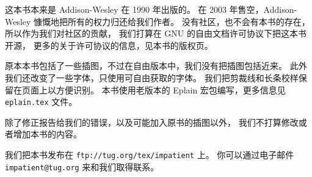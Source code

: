  这本书本来是 Addison-Wesley 在 1990 年出版的。
在 2003 年售空，Addison-Wesley 慷慨地把所有的权力归还给我们作者。
没有社区，也不会有本书的存在，所以作为我们对社区的贡献，
我们打算在 GNU 的自由文档许可协议下把这本书开源，
更多的关于许可协议的信息，见本书的版权页。


原本本书包括了一些插图，不过在自由版本中，我们没有把插图包括近来。
此外我们还改变了一些字体，只使用可自由获取的字体。
我们把剪裁线和长条校样保留在页面上以方便识别。
本书使用老版本的 Eplain 宏包编写，更多信息见 {\tt eplain.tex} 文件。


除了修正报告给我们的错误，以及可能加入原书的插图以外，
我们不打算修改或者增加本书的内容。


我们把本书发布在 {\tt ftp://tug.org/tex/impatient} 上。
你可以通过电子邮件 {\tt impatient@tug.org} 来和我们取得联系。
\pagebreak
\byebye
